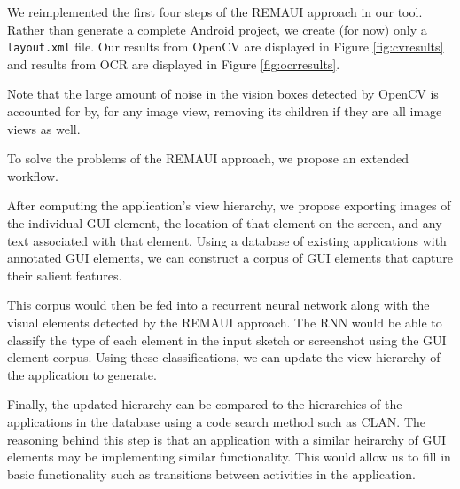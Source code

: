 \documentclass[12pt,twocolumn]{article}
\begin{document}
We reimplemented the first four steps of the REMAUI approach in our tool.
Rather than generate a complete Android project, we create (for now) only a
\verb`layout.xml` file.  Our results from OpenCV are displayed in Figure
\ref{fig:cvresults} and results from OCR are displayed in Figure
\ref{fig:ocrresults}.

Note that the large amount of noise in the vision boxes detected by OpenCV is
accounted for by, for any image view, removing its children if they are all
image views as well.

To solve the problems of the REMAUI approach, we propose an extended workflow.

After computing the application's view hierarchy, we propose exporting images of
the individual GUI element, the location of that element on the screen, and any
text associated with that element.  Using a database of existing applications
with annotated GUI elements, we can construct a corpus of GUI elements that
capture their salient features.

This corpus would then be fed into a recurrent neural network along with the
visual elements detected by the REMAUI approach.  The RNN would be able to
classify the type of each element in the input sketch or screenshot using the
GUI element corpus.  Using these classifications, we can update the view
hierarchy of the application to generate.

Finally, the updated hierarchy can be compared to the hierarchies of the
applications in the database using a code search method such as CLAN\cite{clan}.
The reasoning behind this step is that an application with a similar heirarchy
of GUI elements may be implementing similar functionality.  This would allow us
to fill in basic functionality such as transitions between activities in the
application.
\nocite{*}


\end{document}
